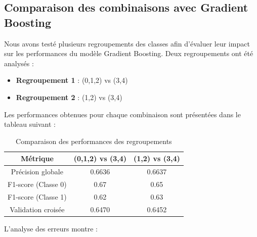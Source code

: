 \documentclass[a4paper,12pt]{article}
\begin{document}
 

\subsection{Comparaison des combinaisons avec Gradient Boosting}
 
Nous avons testé plusieurs regroupements des classes afin d'évaluer leur impact sur les performances du modèle Gradient Boosting. Deux regroupements ont été analysés :
 
\begin{itemize}

    \item \textbf{Regroupement 1} : (0,1,2) vs (3,4)

    \item \textbf{Regroupement 2} : (1,2) vs (3,4)

\end{itemize}
 
\bigskip
 
Les performances obtenues pour chaque combinaison sont présentées dans le tableau suivant :
 
\begin{table}[H]

\centering

\begin{tabular}{|c|c|c|}

\hline

\textbf{Métrique} & \textbf{(0,1,2) vs (3,4)} & \textbf{(1,2) vs (3,4)} \\ \hline

Précision globale & 0.6636 & 0.6637 \\ \hline

F1-score (Classe 0) & 0.67 & 0.65 \\ \hline

F1-score (Classe 1) & 0.62 & 0.63 \\ \hline

Validation croisée & 0.6470 & 0.6452 \\ \hline

\end{tabular}

\caption{Comparaison des performances des regroupements}

\end{table}
 
\bigskip
 
L'analyse des erreurs montre :
 
\end{document}
